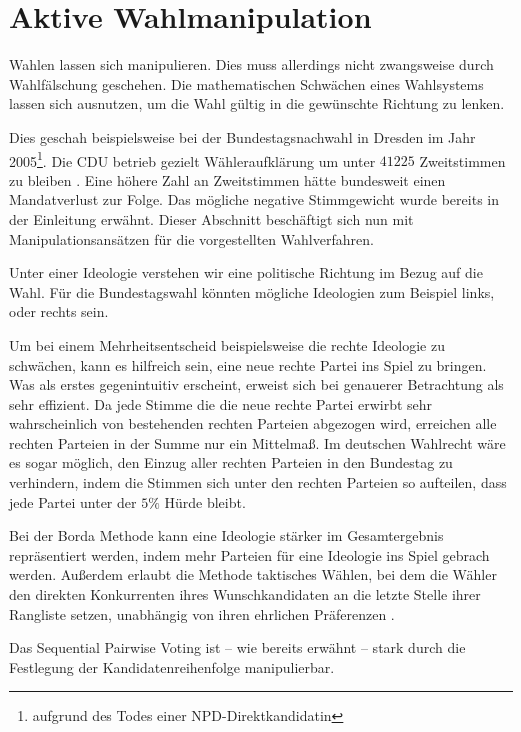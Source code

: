 \documentclass[BCOR5mm,DIV12,a4paper,10pt]{scrartcl}
\begin{document}
\section{Aktive Wahlmanipulation}
Wahlen lassen sich manipulieren. Dies muss allerdings nicht zwangsweise durch Wahlfälschung geschehen. Die mathematischen Schwächen eines Wahlsystems lassen sich ausnutzen, um die Wahl gültig in die gewünschte Richtung zu lenken.

Dies geschah beispielsweise bei der Bundestagsnachwahl in Dresden im Jahr 2005\footnote{ aufgrund des Todes einer NPD-Direktkandidatin}. Die CDU betrieb gezielt Wähleraufklärung um unter $41 225$ Zweitstimmen zu bleiben \cite{handelsblattverf}. Eine höhere Zahl an Zweitstimmen hätte bundesweit einen Mandatverlust zur Folge. Das mögliche negative Stimmgewicht wurde bereits in der Einleitung erwähnt. Dieser Abschnitt beschäftigt sich nun mit Manipulationsansätzen für die vorgestellten Wahlverfahren.

Unter einer Ideologie verstehen wir eine politische Richtung im Bezug auf die Wahl. Für die Bundestagswahl könnten mögliche Ideologien zum Beispiel links, oder rechts sein.
\newline

Um bei einem Mehrheitsentscheid beispielsweise die rechte Ideologie zu schwächen, kann es hilfreich sein, eine neue rechte Partei ins Spiel zu bringen. Was als erstes gegenintuitiv erscheint, erweist sich bei genauerer Betrachtung als sehr effizient. Da jede Stimme die die neue rechte Partei erwirbt sehr wahrscheinlich von bestehenden rechten Parteien abgezogen wird, erreichen alle rechten Parteien in der Summe nur ein Mittelmaß. Im deutschen Wahlrecht wäre es sogar möglich, den Einzug aller rechten Parteien in den Bundestag zu verhindern, indem die Stimmen sich unter den rechten Parteien so aufteilen, dass jede Partei unter der $5\%$ Hürde bleibt.
\newline

Bei der Borda Methode kann eine Ideologie stärker im Gesamtergebnis repräsentiert werden, indem mehr Parteien für eine Ideologie ins Spiel gebrach werden. Außerdem erlaubt die Methode taktisches Wählen, bei dem die Wähler den direkten Konkurrenten ihres Wunschkandidaten an die letzte Stelle ihrer Rangliste setzen, unabhängig von ihren ehrlichen Präferenzen \cite{spektrum}.
\newline

Das Sequential Pairwise Voting ist -- wie bereits erwähnt -- stark durch die Festlegung der Kandidatenreihenfolge manipulierbar.
\newline
\end{document}
